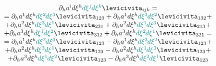 \documentclass[11pt,twoside]{book}
\begin{document}
\[\begin{array}{c}
\partial_h a^{\hspace{-0.1ex}i} d \xi^h \hspace{-0.1ex} {\color{teal}{d\xi^j}} \hspace{-0.16ex} {\color{teal}{d\xi^k}} \levicivita_{i\hspace{-0.1ex}jk}
= \\
= \partial_h a^1 d \xi^h \hspace{-0.1ex} {\color{teal}{d\xi^2}} \hspace{-0.16ex} {\color{teal}{d\xi^3}} \levicivita_{123}
+ \partial_h a^1 d \xi^h \hspace{-0.1ex} {\color{teal}{d\xi^3}} \hspace{-0.16ex} {\color{teal}{d\xi^2}} \levicivita_{132}
+ \\
+ \partial_h a^2 d \xi^h \hspace{-0.1ex} {\color{teal}{d\xi^3}} \hspace{-0.16ex} {\color{teal}{d\xi^1}} \levicivita_{231}
+ \partial_h a^2 d \xi^h \hspace{-0.1ex} {\color{teal}{d\xi^1}} \hspace{-0.16ex} {\color{teal}{d\xi^3}} \levicivita_{213}
+ \\
+ \partial_h a^3 d \xi^h \hspace{-0.1ex} {\color{teal}{d\xi^1}} \hspace{-0.16ex} {\color{teal}{d\xi^2}} \levicivita_{312}
+ \partial_h a^3 d \xi^h \hspace{-0.1ex} {\color{teal}{d\xi^2}} \hspace{-0.16ex} {\color{teal}{d\xi^1}} \levicivita_{321}
= \\
= \partial_h a^1 d \xi^h \hspace{-0.1ex} {\color{teal}{d\xi^2}} \hspace{-0.16ex} {\color{teal}{d\xi^3}} \levicivita_{123}
- \partial_h a^1 d \xi^h \hspace{-0.1ex} {\color{teal}{d\xi^3}} \hspace{-0.16ex} {\color{teal}{d\xi^2}} \levicivita_{123}
+ \\
+ \partial_h a^2 d \xi^h \hspace{-0.1ex} {\color{teal}{d\xi^3}} \hspace{-0.16ex} {\color{teal}{d\xi^1}} \levicivita_{123}
- \partial_h a^2 d \xi^h \hspace{-0.1ex} {\color{teal}{d\xi^1}} \hspace{-0.16ex} {\color{teal}{d\xi^3}} \levicivita_{123}
+ \\
+ \partial_h a^3 d \xi^h \hspace{-0.1ex} {\color{teal}{d\xi^1}} \hspace{-0.16ex} {\color{teal}{d\xi^2}} \levicivita_{123}
- \partial_h a^3 d \xi^h \hspace{-0.1ex} {\color{teal}{d\xi^2}} \hspace{-0.16ex} {\color{teal}{d\xi^1}} \levicivita_{123}
\end{array}\]
\end{document}
